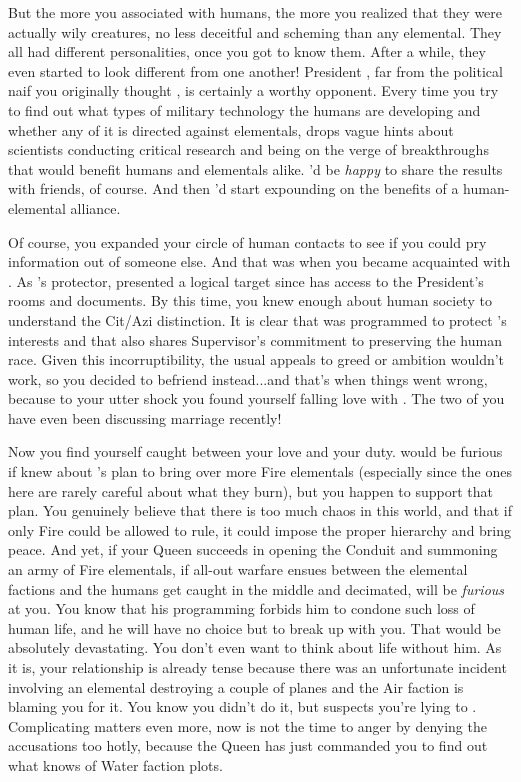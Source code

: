 \documentclass[char]{elementals}
\begin{document}
But the more you associated with humans, the more you realized that they were actually wily creatures, no less deceitful and scheming than any elemental.  They all had different personalities, once you got to know them.  After a while, they even started to look different from one another!  President \cLeader{}, far from the political naif you originally thought \cLeader{\them}, is certainly a worthy opponent.  Every time you try to find out what types of military technology the humans are developing and whether any of it is directed against elementals, \cLeader{\they} drops vague hints about \cLeader{\their} scientists conducting critical research and being on the verge of breakthroughs that would benefit humans and elementals alike.  \cLeader{\They}'d be \emph{happy} to share the results with \cLeader{\their} friends, of course.  And then \cLeader{\they}'d start expounding on the benefits of a human-elemental alliance.

Of course, you expanded your circle of human contacts to see if you could pry information out of someone else.  And that was when you became acquainted with \cRomeo{}.  As \cLeader{}'s protector, \cRomeo{\they} presented a logical target since \cRomeo{\they} has access to the President's rooms and documents.  By this time, you knew enough about human society to understand the Cit/Azi distinction.  It is clear that \cRomeo{\they} was programmed to protect \cLeader{}'s interests and that \cRomeo{\they} also shares \cRomeo{\their} Supervisor's commitment to preserving the human race.  Given this incorruptibility, the usual appeals to greed or ambition wouldn't work, so you decided to befriend \cRomeo{\them} instead...and that's when things went wrong, because to your utter shock you found yourself falling love with \cRomeo{\them}.  The two of you have even been discussing marriage recently!  

Now you find yourself caught between your love and your duty.  \cRomeo{} would be furious if \cRomeo{\they} knew about \cQueen{}'s plan to bring over more Fire elementals (especially since the ones here are rarely careful about what they burn), but you happen to support that plan. You genuinely believe that there is too much chaos in this world, and that if only Fire could be allowed to rule, it could impose the proper hierarchy and bring peace.  And yet, if your Queen succeeds in opening the Conduit and summoning an army of Fire elementals, if all-out warfare ensues between the elemental factions and the humans get caught in the middle and decimated, \cRomeo{} will be \emph{furious} at you.  You know that his programming forbids him to condone such loss of human life, and he will have no choice but to break up with you.  That would be absolutely devastating.  You don't even want to think about life without him.  As it is, your relationship is already tense because there was an unfortunate incident involving an elemental destroying a couple of planes and the Air faction is blaming you for it.  You know you didn't do it, but \cRomeo{} suspects you're lying to \cRomeo{\them}.  Complicating matters even more, now is not the time to anger \cKing{} by denying the accusations too hotly, because the Queen has just commanded you to find out what \cKing{\they} knows of Water faction plots.  
\end{document}
